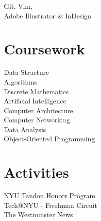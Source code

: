 \documentclass[]{hieudo-build}
\begin{document}
\begin{minipage}[t]{0.34\textwidth}
Git, Vim, \\
Adobe Illustrator \& InDesign \\ 

\sectionsep



\section{Coursework}
Data Structure \\
Algorithms \\
Discrete Mathematics \\
Artificial Intelligence \\
Computer Architecture \\
Computer Networking \\
Data Analysis \\
Object-Oriented Programming\\
\sectionsep

\section{Activities}
NYU Tandon Honors Program\\
Tech@NYU - Freshman Circuit \\
The Westminster News \\
\sectionsep



\sectionsep
{}

%
%
\end{minipage} 
\end{document}
